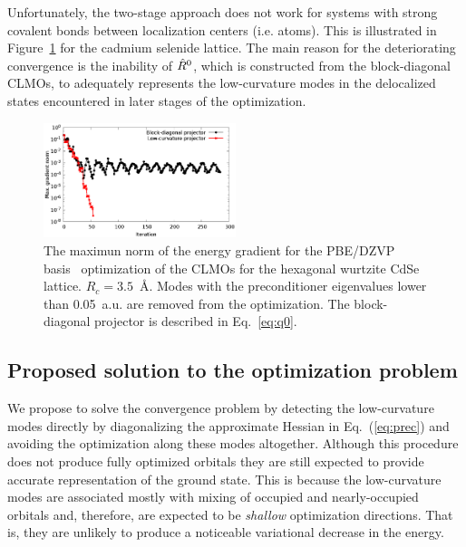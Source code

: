 \documentclass[aps,prl,twocolumn,reprint,amsmath,amssymb]{revtex4-1}
\begin{document}
Unfortunately, the two-stage approach does not work for systems with strong covalent bonds between localization centers (i.e. atoms). This is illustrated in Figure~\ref{fig:convergence} for the cadmium selenide lattice. The main reason for the deteriorating convergence is the inability of $\hat{R}^0$, which is constructed from the block-diagonal CLMOs, to adequately represents the low-curvature modes in the delocalized states encountered in later stages of the optimization. 

\begin{figure}
\centering
\includegraphics[width=0.5\textwidth]{convergence}
\caption{The maximun norm of the energy gradient for the PBE/DZVP basis~\cite{vandevondele2007gaussian} optimization of the CLMOs for the hexagonal wurtzite CdSe lattice. $R_c = 3.5$~{\AA}. Modes with the preconditioner eigenvalues lower than 0.05~a.u. are removed from the optimization. The block-diagonal projector is described in Eq.~\ref{eq:q0}.} 
\label{fig:convergence}
\end{figure}


\subsection{Proposed solution to the optimization problem}

We propose to solve the convergence problem by detecting the low-curvature modes directly by diagonalizing the approximate Hessian in Eq.~(\ref{eq:prec}) and avoiding the optimization along these modes altogether. Although this procedure does not produce fully optimized orbitals they are still expected to provide accurate representation of the ground state. This is because the low-curvature modes are associated mostly with mixing of occupied and nearly-occupied orbitals and, therefore, are expected to be \emph{shallow} optimization directions. That is, they are unlikely to produce a noticeable variational decrease in the energy.
\end{document}
